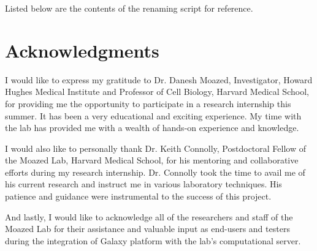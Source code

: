\documentclass[a4paper,10pt]{article}
\begin{document}
Listed below are the contents of the renaming script for reference.\\


\section{Acknowledgments}
I would like to express my gratitude to Dr. Danesh Moazed, Investigator, Howard Hughes Medical Institute and Professor of Cell Biology, Harvard Medical School, for providing me the opportunity to participate in a research internship this summer.  It has been a very educational and exciting experience.  My time with the lab has provided me with a wealth of hands-on experience and knowledge.

I would also like to personally thank Dr. Keith Connolly, Postdoctoral Fellow of the Moazed Lab, Harvard Medical School, for his mentoring and collaborative efforts during my research internship.  Dr. Connolly took the time to avail me of his current research and instruct me in various laboratory techniques.  His patience and guidance were instrumental to the success of this project.

And lastly, I would like to acknowledge all of the researchers and staff of the Moazed Lab for their assistance and valuable input as end-users and testers during the integration of Galaxy platform with the lab's computational server.
\end{document}
